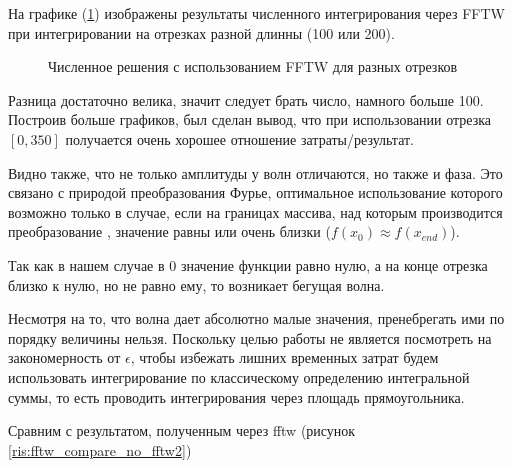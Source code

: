 \documentclass[14pt, a4paper]{article}
\numberwithin{figure}{section}
\numberwithin{equation}{section}
\begin{document}
На графике (\ref{ris:fftw_compare}) изображены результаты численного интегрирования через FFTW при интегрировании на отрезках разной длинны (100 или 200). 

\begin{figure}[h]
	\caption{Численное решения с использованием FFTW для разных отрезков}
	\label{ris:fftw_compare}
\end{figure}

Разница достаточно велика, значит следует брать число, намного больше 100. Построив больше графиков, был сделан вывод, что при использовании отрезка $[0, 350]$ получается очень хорошее отношение затраты/результат.

Видно также, что не только амплитуды у волн отличаются, но также и фаза. Это связано с природой преобразования Фурье, оптимальное использование которого возможно только в случае, если на границах массива, над которым производится преобразование , значение равны или очень близки ($f(x_0) \approx f(x_{end})$).

Так как в нашем случае в 0 значение функции равно нулю, а на конце отрезка близко к нулю, но не равно ему, то возникает бегущая волна.

Несмотря на то, что волна дает абсолютно малые значения, пренебрегать ими по порядку величины нельзя. Поскольку целью работы не является посмотреть на закономерность от $\epsilon$, чтобы избежать лишних временных затрат будем использовать интегрирование по классическому определению интегральной суммы, то есть проводить интегрирования через площадь прямоугольника.\cite{nrc}

Сравним с результатом, полученным через fftw (рисунок \ref{ris:fftw_compare_no_fftw2})
\end{document}
